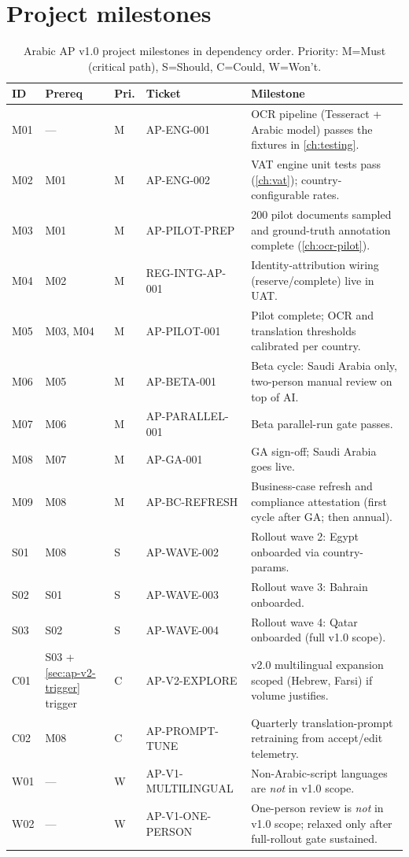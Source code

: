 \documentclass[11pt,a4paper,twoside]{report}
\begin{document}
\section{Project milestones}\label{sec:ap-milestones}

\begin{table}[htbp]
\centering
\caption{Arabic AP v1.0 project milestones in dependency order.
Priority: M=Must (critical path), S=Should, C=Could, W=Won't.}
\label{tab:ap-milestones}
\footnotesize
\begin{tabularx}{\linewidth}{@{}l l l l X@{}}
\toprule
\textbf{ID} & \textbf{Prereq} & \textbf{Pri.} & \textbf{Ticket} & \textbf{Milestone} \\ \midrule
M01 & ---       & M & AP-ENG-001         & OCR pipeline (Tesseract + Arabic model) passes the fixtures in \cref{ch:testing}. \\
M02 & M01       & M & AP-ENG-002         & VAT engine unit tests pass (\cref{ch:vat}); country-configurable rates.\\
M03 & M01       & M & AP-PILOT-PREP      & 200 pilot documents sampled and ground-truth annotation complete (\cref{ch:ocr-pilot}). \\
M04 & M02       & M & REG-INTG-AP-001    & Identity-attribution wiring (reserve/complete) live in UAT. \\
M05 & M03, M04  & M & AP-PILOT-001       & Pilot complete; OCR and translation thresholds calibrated per country. \\
M06 & M05       & M & AP-BETA-001        & Beta cycle: Saudi Arabia only, two-person manual review on top of AI. \\
M07 & M06       & M & AP-PARALLEL-001    & Beta parallel-run gate passes. \\
M08 & M07       & M & AP-GA-001          & GA sign-off; Saudi Arabia goes live. \\
M09 & M08       & M & AP-BC-REFRESH      & Business-case refresh and compliance attestation (first cycle after GA; then annual). \\
S01 & M08       & S & AP-WAVE-002        & Rollout wave 2: Egypt onboarded via country-params. \\
S02 & S01       & S & AP-WAVE-003        & Rollout wave 3: Bahrain onboarded. \\
S03 & S02       & S & AP-WAVE-004        & Rollout wave 4: Qatar onboarded (full v1.0 scope). \\
C01 & S03 + \cref{sec:ap-v2-trigger} trigger & C & AP-V2-EXPLORE & v2.0 multilingual expansion scoped (Hebrew, Farsi) if volume justifies. \\
C02 & M08       & C & AP-PROMPT-TUNE     & Quarterly translation-prompt retraining from accept/edit telemetry. \\
W01 & ---       & W & AP-V1-MULTILINGUAL & Non-Arabic-script languages are \emph{not} in v1.0 scope. \\
W02 & ---       & W & AP-V1-ONE-PERSON   & One-person review is \emph{not} in v1.0 scope; relaxed only after full-rollout gate sustained. \\
\bottomrule
\end{tabularx}
\end{table}
\end{document}
